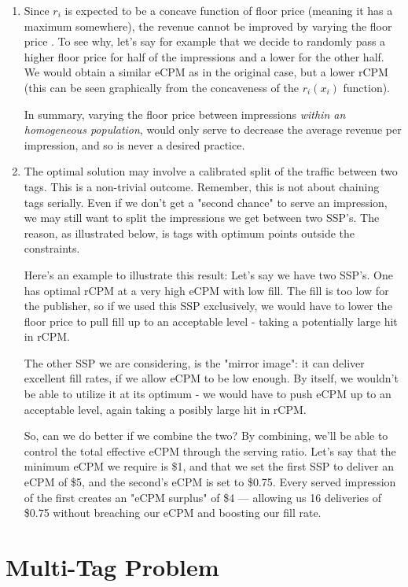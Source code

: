 \documentclass{article}
\begin{document}
\begin{large}
\begin{enumerate}
\item Since $r_i$ is expected to be a concave function of floor price (meaning it has a maximum somewhere), the revenue cannot be improved by varying the floor price . To see why, let's say for example that we decide to randomly pass a higher floor price for half of the impressions and a lower for the other half. We would obtain a similar eCPM as in the original case, but a lower rCPM (this can be seen graphically from the concaveness of the $r_i(x_i)$ function). 

In summary, varying the floor price between impressions \emph{within an homogeneous population}, would only serve to decrease the average revenue per impression, and so is never a desired practice.

\item The optimal solution may involve a calibrated split of the traffic between two tags. This is a non-trivial outcome. Remember, this is not about chaining tags serially. Even if we don't get a "second chance" to serve an impression, we may still want to split the impressions we get between two SSP's. The reason, as illustrated below, is tags with optimum points outside the constraints. 

Here's an example to illustrate this result: Let's say we have two SSP's. One has optimal rCPM at a very high eCPM with low fill. The fill is too low for the publisher, so if we used this SSP exclusively, we would have to lower the floor price to pull fill up to an acceptable level - taking a potentially large hit in rCPM. 

The other SSP we are considering, is the "mirror image": it can deliver excellent fill rates, if we allow eCPM to be low enough. By itself, we wouldn't be able to utilize it at its optimum - we would have to push eCPM up to an acceptable level, again taking a posibly large hit in rCPM.

So, can we do better if we combine the two? By combining, we'll be able to control the total effective eCPM through the serving ratio. Let's say that the minimum eCPM we require is \$1, and that we set the first SSP to deliver an eCPM of \$5, and the second's eCPM is set to \$0.75. Every served impression of the first creates an "eCPM surplus" of \$4 --- allowing us 16 deliveries of \$0.75 without breaching our eCPM and boosting our fill rate.
\end{enumerate}

\section{Multi-Tag Problem}

\end{large}
\end{document}

